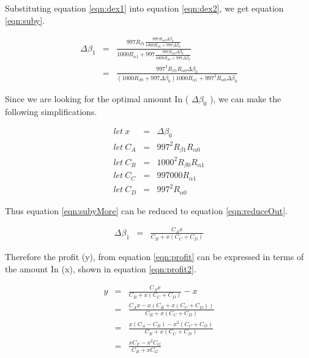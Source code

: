 \documentclass[runningheads]{llncs}
\begin{document}
	
	Substituting equation \ref{eqn:dex1} into equation \ref{eqn:dex2}, we get equation \ref{eqn:suby}.
	
	\begin{eqnarray}
		\Delta\beta_{1}  &=& \frac{997 R_{\beta 1} \frac{997 R_{\alpha 0} \Delta\beta_{0} }{1000 R_{\beta 0} + 997 \Delta\beta_{0}} }{1000 R_{\alpha 1} + 997 \frac{997 R_{\alpha 0} \Delta\beta_{0} }{1000 R_{\beta 0} + 997 \Delta\beta_{0}}} \label{eqn:suby}\\
		&=& \frac{997^2 R_{\beta 1}  R_{\alpha 0} \Delta\beta_{0} }{(1000 R_{\beta 0} + 997 \Delta\beta_{0}) 1000 R_{\alpha 1} + 997^2 R_{\alpha 0} \Delta\beta_{0} } \label{eqn:subyMore}
	\end{eqnarray}
	
	Since we are looking for the optimal amount In ( \(\Delta\beta_{0}\) ), we can make the following simplifications.
	
	\begin{eqnarray}
		let \: x &=& \Delta\beta_{0}\\
		let \: C_{A} &=& 997^2 R_{\beta 1}  R_{\alpha 0}\\
		let \: C_{B} &=& 1000^2 R_{\beta 0} R_{\alpha 1}\\
		let \: C_{C} &=& 997000  R_{\alpha 1}\\
		let \: C_{D} &=& 997^2  R_{\alpha 0}
	\end{eqnarray}
	
	Thus equation \ref{eqn:subyMore} can be reduced to equation \ref{eqn:reduceOut}.
	
	\begin{eqnarray}
		\Delta\beta_{1}  &=& \frac{C_{A} x}{C_{B} + x(C_{C} + C_{D})} \label{eqn:reduceOut}
	\end{eqnarray}
	
	Therefore the profit (y), from equation \ref{eqn:profit} can be expressed in terms of the amount In (x), shown in equation \ref{eqn:profit2}.
	
	\begin{eqnarray}
		y  &=& \frac{C_{A} x}{C_{B} + x(C_{C} + C_{D})} - x \label{eqn:profit2}\\
		&=& \frac{C_{A} x - x(C_{B} + x(C_{C} + C_{D}))}{C_{B} + x(C_{C} + C_{D})} \label{eqn:profit3}\\
		&=& \frac{x(C_{A} - C_{B}) - x^2(C_{C} + C_{D})}{C_{B} + x(C_{C} + C_{D})} \label{eqn:profit4}\\
		&=& \frac{x C_{F} - x^2 C_{G} }{C_{B} + x C_{G}} \label{eqn:profit5}
	\end{eqnarray}
	
\end{document}
